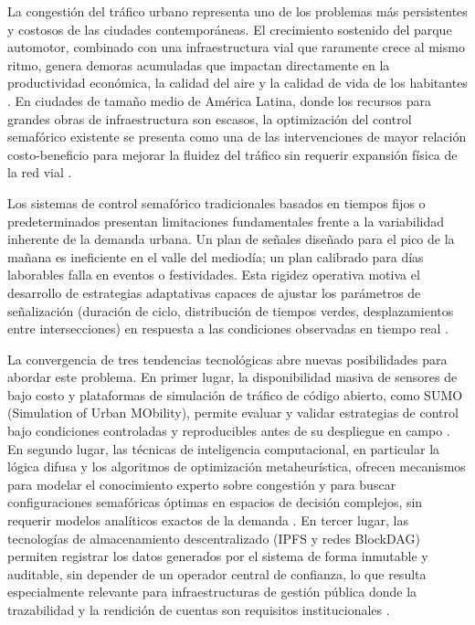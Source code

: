 La congestión del tráfico urbano representa uno de los problemas más persistentes y
costosos de las ciudades contemporáneas. El crecimiento sostenido del parque automotor,
combinado con una infraestructura vial que raramente crece al mismo ritmo, genera demoras
acumuladas que impactan directamente en la productividad económica, la calidad del aire y
la calidad de vida de los habitantes \cite{papageorgiou2003review,garber2019traffic}. En
ciudades de tamaño medio de América Latina, donde los recursos para grandes obras de
infraestructura son escasos, la optimización del control semafórico existente se presenta
como una de las intervenciones de mayor relación costo-beneficio para mejorar la fluidez
del tráfico sin requerir expansión física de la red vial \cite{stevanovic2010adaptive}.

Los sistemas de control semafórico tradicionales basados en tiempos fijos o predeterminados
presentan limitaciones fundamentales frente a la variabilidad inherente de la demanda urbana.
Un plan de señales diseñado para el pico de la mañana es ineficiente en el valle del mediodía;
un plan calibrado para días laborables falla en eventos o festividades. Esta rigidez
operativa motiva el desarrollo de estrategias adaptativas capaces de ajustar los parámetros
de señalización (duración de ciclo, distribución de tiempos verdes, desplazamientos entre
intersecciones) en respuesta a las condiciones observadas en tiempo real
\cite{papageorgiou2003review,stevanovic2010adaptive,li2016realtime}.

La convergencia de tres tendencias tecnológicas abre nuevas posibilidades para abordar este
problema. En primer lugar, la disponibilidad masiva de sensores de bajo costo y plataformas
de simulación de tráfico de código abierto, como SUMO (Simulation of Urban MObility),
permite evaluar y validar estrategias de control bajo condiciones controladas y reproducibles
antes de su despliegue en campo \cite{behrisch2011sumo}. En segundo lugar, las técnicas de
inteligencia computacional, en particular la lógica difusa y los algoritmos de optimización
metaheurística, ofrecen mecanismos para modelar el conocimiento experto sobre congestión y
para buscar configuraciones semafóricas óptimas en espacios de decisión complejos, sin requerir
modelos analíticos exactos de la demanda \cite{zadeh1965fuzzy,kennedy1995particle}. En tercer
lugar, las tecnologías de almacenamiento descentralizado (IPFS y redes BlockDAG) permiten
registrar los datos generados por el sistema de forma inmutable y auditable, sin depender de
un operador central de confianza, lo que resulta especialmente relevante para infraestructuras
de gestión pública donde la trazabilidad y la rendición de cuentas son requisitos
institucionales \cite{benet2014ipfs,sompolinsky2021phantom}.

